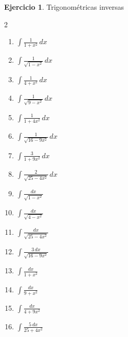 \documentclass[12pt]{article}
\theoremstyle{definition}
\newtheorem{Ejer}[teorema]{Ejercicio}
\theoremstyle{remark}
\begin{document}
\begin{Ejer}{Trigonométricas inversas}
\begin{multicols}{2}
\begin{enumerate}[resume=integrales]
\item $\displaystyle \int\frac{1}{1+x^2}\,dx$
\item $\displaystyle \int\frac{1}{\sqrt{1-x^2}}\,dx$
\item $\displaystyle \int\frac{1}{4+x^2}\,dx$
\item $\displaystyle \int\frac{1}{\sqrt{9-x^2}}\,dx$
\item $\displaystyle \int\frac{1}{1+4x^2}\,dx$
\item $\displaystyle \int\frac{1}{\sqrt{16-9x^2}}\,dx$
\item $\displaystyle \int\frac{3}{1+9x^2}\,dx$
\item $\displaystyle \int\frac{2}{\sqrt{25-4x^2}}\,dx$
\item $\displaystyle \int \frac{dx}{\sqrt{1-x^2}}$
\item $\displaystyle \int \frac{dx}{\sqrt{4-x^2}}$
\item $\displaystyle \int \frac{dx}{\sqrt{25-4x^2}}$
\item $\displaystyle \int \frac{3\,dx}{\sqrt{16-9x^2}}$
\item $\displaystyle \int \frac{dx}{1+x^2}$
\item $\displaystyle \int \frac{dx}{9+x^2}$
\item $\displaystyle \int \frac{dx}{4+9x^2}$
\item $\displaystyle \int \frac{5\,dx}{25+4x^2}$
\end{enumerate}
\end{multicols}
\end{Ejer}
\end{document}
